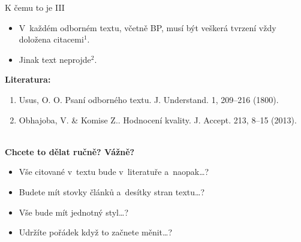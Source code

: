 \documentclass[compress, ucs, xelatex, xcolor=dvipsnames, print,
	hyperref={
		bookmarks=true,
		unicode=true,
		colorlinks=true,
		pdftitle={Citacni software},
		plainpages=false,
		pdfauthor={Vojtech Zeisek},
		pdfsubject={Kratky uvod do citacniho software},
		pdfcreator={XeLaTeX},
		pdfkeywords={citace, reference, software, literatura},
		linkcolor=Red,
		anchorcolor=Red,
		citecolor=Green,
		filecolor=Magenta,
		menucolor=Green,
		urlcolor=Cyan,
		pdftex},
	url={hyphens, lowtilde} %
	]{beamer}
\begin{document}
\begin{frame}{K čemu to je III}
	\begin{itemize}
		\item V~každém odborném textu, včetně BP, musí být veškerá tvrzení vždy doložena citacemi$^{1}$.
		\item Jinak text neprojde$^{2}$.
	\end{itemize}
	\textbf{Literatura:}
	\begin{enumerate}
		\item Usus, O. O. Psaní odborného textu. J. Understand. 1, 209–216 (1800).
		\item Obhajoba, V. \& Komise Z.. Hodnocení kvality. J. Accept. 213, 8–15 (2013).
	\end{enumerate}
	\hrulefill\\
	\textbf{Chcete to dělat ručně? Vážně?}
	\begin{itemize}
		\item Vše citované v~textu bude v~literatuře a~naopak\ldots?
		\item Budete mít stovky článků a~desítky stran textu\ldots?
		\item Vše bude mít jednotný styl\ldots?
		\item Udržíte pořádek když to začnete měnit\ldots?
	\end{itemize}
\end{frame}
\end{document}
